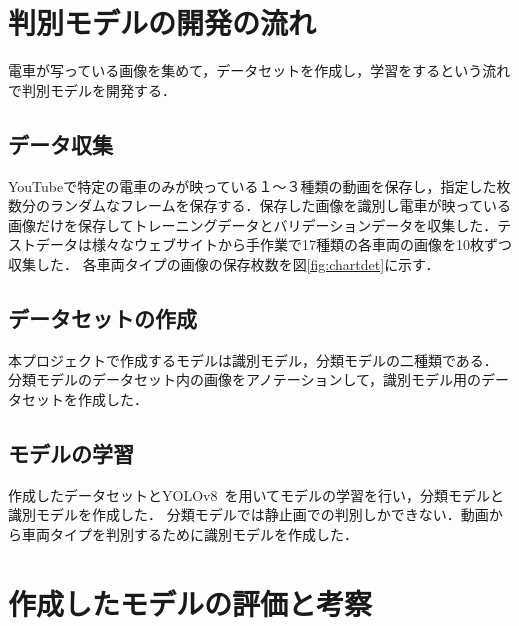 \begin{multicols*}{2}
\section{判別モデルの開発の流れ}
電車が写っている画像を集めて，データセットを作成し，学習をするという流れで判別モデルを開発する．

\subsection{データ収集}
YouTubeで特定の電車のみが映っている１〜３種類の動画を保存し，指定した枚数分のランダムなフレームを保存する．保存した画像を識別し電車が映っている画像だけを保存してトレーニングデータとバリデーションデータを収集した．テストデータは様々なウェブサイトから手作業で17種類の各車両の画像を10枚ずつ収集した．
各車両タイプの画像の保存枚数を図\ref{fig:chartdet}に示す．
\subsection{データセットの作成}
本プロジェクトで作成するモデルは識別モデル，分類モデルの二種類である．
分類モデルのデータセット内の画像をアノテーションして，識別モデル用のデータセットを作成した．


\subsection{モデルの学習}
作成したデータセットとYOLOv8~\cite{bk1}を用いてモデルの学習を行い，分類モデルと識別モデルを作成した．
分類モデルでは静止画での判別しかできない．動画から車両タイプを判別するために識別モデルを作成した．




\section{作成したモデルの評価と考察}

\end{multicols*}
